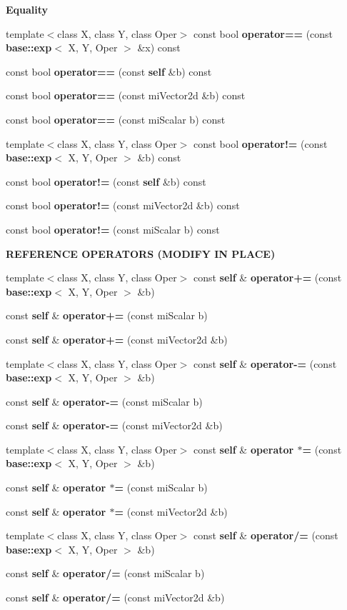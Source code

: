 \begin{Indent}{\bf Equality}\par
\begin{CompactItemize}
\item 
template$<$class X, class Y, class Oper$>$ const bool {\bf operator==} (const {\bf base::exp}$<$ X, Y, Oper $>$ \&x) const 
\item 
const bool {\bf operator==} (const {\bf self} \&b) const 
\item 
const bool {\bf operator==} (const mi\-Vector2d \&b) const 
\item 
const bool {\bf operator==} (const mi\-Scalar b) const 
\item 
template$<$class X, class Y, class Oper$>$ const bool {\bf operator!=} (const {\bf base::exp}$<$ X, Y, Oper $>$ \&b) const 
\item 
const bool {\bf operator!=} (const {\bf self} \&b) const 
\item 
const bool {\bf operator!=} (const mi\-Vector2d \&b) const 
\item 
const bool {\bf operator!=} (const mi\-Scalar b) const 
\end{CompactItemize}
\end{Indent}
\begin{Indent}{\bf REFERENCE OPERATORS (MODIFY IN PLACE)}\par
\begin{CompactItemize}
\item 
template$<$class X, class Y, class Oper$>$ const {\bf self} \& {\bf operator+=} (const {\bf base::exp}$<$ X, Y, Oper $>$ \&b)
\item 
const {\bf self} \& {\bf operator+=} (const mi\-Scalar b)
\item 
const {\bf self} \& {\bf operator+=} (const mi\-Vector2d \&b)
\item 
template$<$class X, class Y, class Oper$>$ const {\bf self} \& {\bf operator-=} (const {\bf base::exp}$<$ X, Y, Oper $>$ \&b)
\item 
const {\bf self} \& {\bf operator-=} (const mi\-Scalar b)
\item 
const {\bf self} \& {\bf operator-=} (const mi\-Vector2d \&b)
\item 
template$<$class X, class Y, class Oper$>$ const {\bf self} \& {\bf operator $\ast$=} (const {\bf base::exp}$<$ X, Y, Oper $>$ \&b)
\item 
const {\bf self} \& {\bf operator $\ast$=} (const mi\-Scalar b)
\item 
const {\bf self} \& {\bf operator $\ast$=} (const mi\-Vector2d \&b)
\item 
template$<$class X, class Y, class Oper$>$ const {\bf self} \& {\bf operator/=} (const {\bf base::exp}$<$ X, Y, Oper $>$ \&b)
\item 
const {\bf self} \& {\bf operator/=} (const mi\-Scalar b)
\item 
const {\bf self} \& {\bf operator/=} (const mi\-Vector2d \&b)
\end{CompactItemize}
\end{Indent}


